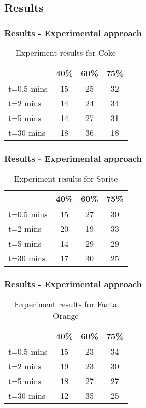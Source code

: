 \documentclass[compress,handout,10pt]{beamer}
\begin{document}
\subsection{Results}
\begin{frame}
    \frametitle{Results - Experimental approach}

\begin{table}[ h]
\centering
\begin{tabular}{ l || c|c|c }
  &40\% &60\% & 75\%  \\
\hline  
t=0.5 mins & 15 & 25 & 32\\ 
\hline  
t=2 mins & 14 & 24 & 34\\ 
\hline  
t=5 mins & 14 & 27 & 31\\ 
\hline  
t=30 mins & 18 & 36 & 18\\ 
\hline  
   
 \end{tabular}

\caption{Experiment results for Coke}

\end{table}
\end{frame}

\begin{frame}
    \frametitle{Results - Experimental approach}

\begin{table}[ h]
\centering
\begin{tabular}{ l || c|c|c }
  &40\% &60\% & 75\%  \\
\hline  
t=0.5 mins & 15 & 27 & 30\\ 
\hline  
t=2 mins & 20 & 19 & 33\\ 
\hline  
t=5 mins & 14 & 29 & 29\\ 
\hline  
t=30 mins & 17 & 30 & 25\\ 
\hline  
   
 \end{tabular}

\caption{Experiment results for Sprite}

\end{table}
\end{frame}

\begin{frame}
    \frametitle{Results - Experimental approach}

\begin{table}[ h]
\centering
\begin{tabular}{ l || c|c|c }
  &40\% &60\% & 75\% \\
\hline  
t=0.5 mins & 15 & 23 & 34\\ 
\hline  
t=2 mins & 19 & 23 & 30\\ 
\hline  
t=5 mins & 18 & 27 & 27\\ 
\hline  
t=30 mins & 12 & 35 & 25\\ 
\hline  
   
 \end{tabular}

\caption{Experiment results for Fanta Orange}

\end{table}
\end{frame}
\end{document}
